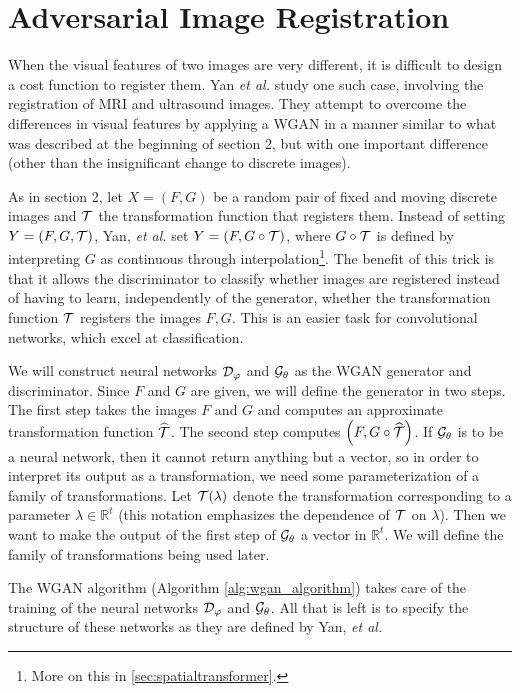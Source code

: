 \documentclass{article}
\newcommand{\R}{\mathbb{R}}
\begin{document}
	\section{Adversarial Image Registration}\label{sec:air}
	When the visual features of two images are very different, it is difficult to design a cost function to register them. Yan \textit{et al.} \cite{yan-xu-rastinehad-wood} study one such case, involving the registration of MRI and ultrasound images. They attempt to overcome the differences in visual features by applying a WGAN in a manner similar to what was described at the beginning of section 2, but with one important difference (other than the insignificant change to discrete images).
	
	As in section 2, let \(X = (F, G)\) be a random pair of fixed and moving discrete images and \(\mathcal{T}\) the transformation function that registers them. Instead of setting \(Y = (F, G, \mathcal{T})\), Yan, \textit{et al.} set \(Y = (F, G \circ \mathcal{T})\), where \(G \circ \mathcal{T}\) is defined by interpreting \(G\) as continuous through interpolation\footnote{More on this in \ref{sec:spatialtransformer}.}. The benefit of this trick is that it allows the discriminator to classify whether images are registered instead of having to learn, independently of the generator, whether the transformation function \(\mathcal{T}\) registers the images \(F, G\). This is an easier task for convolutional networks, which excel at classification.
	
	We will construct neural networks \(\mathcal{D}_\varphi\) and \(\mathcal{G}_\theta\) as the WGAN generator and discriminator. Since \(F\) and \(G\) are given, we will define the generator in two steps. The first step takes the images \(F\) and \(G\) and computes an approximate transformation function \(\widehat{\mathcal{T}}\). The second step computes \(\left(F, G\circ\widehat{\mathcal{T}}\right)\). If \(\mathcal{G}_\theta\) is to be a neural network, then it cannot return anything but a vector, so in order to interpret its output as a transformation, we need some parameterization of a family of transformations. Let \(\mathcal{T}(\lambda)\) denote the transformation corresponding to a parameter \(\lambda \in \R^t\) (this notation emphasizes the dependence of \(\mathcal{T}\) on \(\lambda\)). Then we want to make the output of the first step of \(\mathcal{G}_\theta\) a vector in \(\R^t\). We will define the family of transformations being used later.
	
	The WGAN algorithm (Algorithm \ref{alg:wgan_algorithm}) takes care of the training of the neural networks \(\mathcal{D}_\varphi\) and \(\mathcal{G}_{\theta}\). All that is left is to specify the structure of these networks as they are defined by Yan, \textit{et al.}
	
\end{document}
